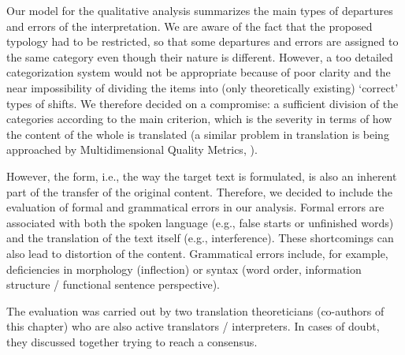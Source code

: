 \documentclass[output=paper]{langscibook}
\begin{document}
Our model for the qualitative analysis summarizes the main types of departures and errors of the interpretation. We are aware of the fact that the proposed typology had to be restricted, so that some departures and errors are assigned to the same category even though their nature is different. However, a too detailed categorization system would not be appropriate because of poor clarity and the near impossibility of dividing the items into (only theoretically existing) ‘correct’ types of shifts. We therefore decided on a compromise: a sufficient division of the categories according to the main criterion, which is the severity in terms of how the content of the whole is translated (a similar problem in translation is being approached by Multidimensional Quality Metrics, \citealt{Burchardt2013}).

However, the form, i.e., the way the target text is formulated, is also an inherent part of the transfer of the original content. Therefore, we decided to include the evaluation of formal and grammatical errors in our analysis. Formal errors are associated with both the spoken language (e.g., false starts or unfinished words) and the translation of the text itself (e.g., interference). These shortcomings can also lead to distortion of the content. Grammatical errors include, for example, deficiencies in morphology (inflection) or syntax (word order, information structure / functional sentence perspective).

The evaluation was carried out by two translation theoreticians (co-authors of this chapter) who are also active translators / interpreters. In cases of doubt, they discussed together trying to reach a consensus.
\end{document}
